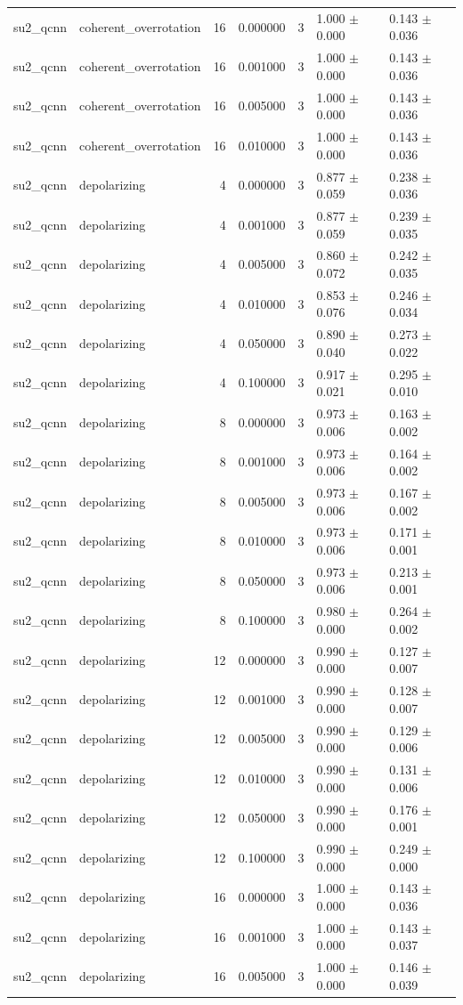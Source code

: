 \begin{tabular}{llrrrll}
su2_qcnn & coherent_overrotation & 16 & 0.000000 & 3 & 1.000 $\pm$ 0.000 & 0.143 $\pm$ 0.036 \\
su2_qcnn & coherent_overrotation & 16 & 0.001000 & 3 & 1.000 $\pm$ 0.000 & 0.143 $\pm$ 0.036 \\
su2_qcnn & coherent_overrotation & 16 & 0.005000 & 3 & 1.000 $\pm$ 0.000 & 0.143 $\pm$ 0.036 \\
su2_qcnn & coherent_overrotation & 16 & 0.010000 & 3 & 1.000 $\pm$ 0.000 & 0.143 $\pm$ 0.036 \\
su2_qcnn & depolarizing & 4 & 0.000000 & 3 & 0.877 $\pm$ 0.059 & 0.238 $\pm$ 0.036 \\
su2_qcnn & depolarizing & 4 & 0.001000 & 3 & 0.877 $\pm$ 0.059 & 0.239 $\pm$ 0.035 \\
su2_qcnn & depolarizing & 4 & 0.005000 & 3 & 0.860 $\pm$ 0.072 & 0.242 $\pm$ 0.035 \\
su2_qcnn & depolarizing & 4 & 0.010000 & 3 & 0.853 $\pm$ 0.076 & 0.246 $\pm$ 0.034 \\
su2_qcnn & depolarizing & 4 & 0.050000 & 3 & 0.890 $\pm$ 0.040 & 0.273 $\pm$ 0.022 \\
su2_qcnn & depolarizing & 4 & 0.100000 & 3 & 0.917 $\pm$ 0.021 & 0.295 $\pm$ 0.010 \\
su2_qcnn & depolarizing & 8 & 0.000000 & 3 & 0.973 $\pm$ 0.006 & 0.163 $\pm$ 0.002 \\
su2_qcnn & depolarizing & 8 & 0.001000 & 3 & 0.973 $\pm$ 0.006 & 0.164 $\pm$ 0.002 \\
su2_qcnn & depolarizing & 8 & 0.005000 & 3 & 0.973 $\pm$ 0.006 & 0.167 $\pm$ 0.002 \\
su2_qcnn & depolarizing & 8 & 0.010000 & 3 & 0.973 $\pm$ 0.006 & 0.171 $\pm$ 0.001 \\
su2_qcnn & depolarizing & 8 & 0.050000 & 3 & 0.973 $\pm$ 0.006 & 0.213 $\pm$ 0.001 \\
su2_qcnn & depolarizing & 8 & 0.100000 & 3 & 0.980 $\pm$ 0.000 & 0.264 $\pm$ 0.002 \\
su2_qcnn & depolarizing & 12 & 0.000000 & 3 & 0.990 $\pm$ 0.000 & 0.127 $\pm$ 0.007 \\
su2_qcnn & depolarizing & 12 & 0.001000 & 3 & 0.990 $\pm$ 0.000 & 0.128 $\pm$ 0.007 \\
su2_qcnn & depolarizing & 12 & 0.005000 & 3 & 0.990 $\pm$ 0.000 & 0.129 $\pm$ 0.006 \\
su2_qcnn & depolarizing & 12 & 0.010000 & 3 & 0.990 $\pm$ 0.000 & 0.131 $\pm$ 0.006 \\
su2_qcnn & depolarizing & 12 & 0.050000 & 3 & 0.990 $\pm$ 0.000 & 0.176 $\pm$ 0.001 \\
su2_qcnn & depolarizing & 12 & 0.100000 & 3 & 0.990 $\pm$ 0.000 & 0.249 $\pm$ 0.000 \\
su2_qcnn & depolarizing & 16 & 0.000000 & 3 & 1.000 $\pm$ 0.000 & 0.143 $\pm$ 0.036 \\
su2_qcnn & depolarizing & 16 & 0.001000 & 3 & 1.000 $\pm$ 0.000 & 0.143 $\pm$ 0.037 \\
su2_qcnn & depolarizing & 16 & 0.005000 & 3 & 1.000 $\pm$ 0.000 & 0.146 $\pm$ 0.039 \\
\bottomrule
\end{tabular}
